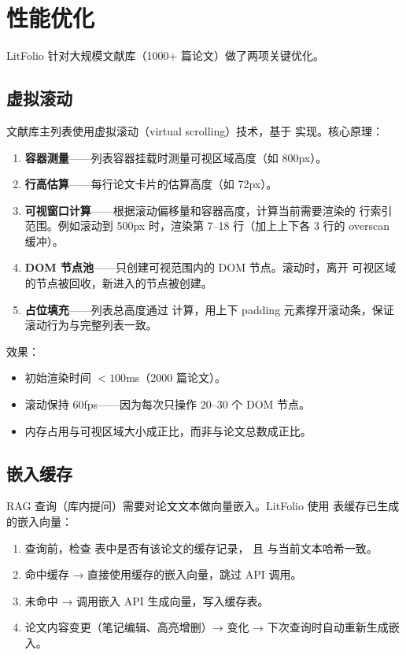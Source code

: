 \section{性能优化}

LitFolio 针对大规模文献库（1000+ 篇论文）做了两项关键优化。

\subsection{虚拟滚动}

文献库主列表使用虚拟滚动（virtual scrolling）技术，基于
 实现。核心原理：

\begin{enumerate}
  \item \textbf{容器测量}——列表容器挂载时测量可视区域高度（如 800px）。
  \item \textbf{行高估算}——每行论文卡片的估算高度（如 72px）。
  \item \textbf{可视窗口计算}——根据滚动偏移量和容器高度，计算当前需要渲染的
    行索引范围。例如滚动到 500px 时，渲染第 7--18 行（加上上下各 3 行的
    overscan 缓冲）。
  \item \textbf{DOM 节点池}——只创建可视范围内的 DOM 节点。滚动时，离开
    可视区域的节点被回收，新进入的节点被创建。
  \item \textbf{占位填充}——列表总高度通过 
    计算，用上下 padding 元素撑开滚动条，保证滚动行为与完整列表一致。
\end{enumerate}

效果：

\begin{itemize}
  \item 初始渲染时间 $< 100$ms（2000 篇论文）。
  \item 滚动保持 60fps——因为每次只操作 20--30 个 DOM 节点。
  \item 内存占用与可视区域大小成正比，而非与论文总数成正比。
\end{itemize}

\subsection{嵌入缓存}

RAG 查询（库内提问）需要对论文文本做向量嵌入。LitFolio 使用
 表缓存已生成的嵌入向量：

\begin{enumerate}
  \item 查询前，检查  表中是否有该论文的缓存记录，
    且  与当前文本哈希一致。
  \item 命中缓存 → 直接使用缓存的嵌入向量，跳过 API 调用。
  \item 未命中 → 调用嵌入 API 生成向量，写入缓存表。
  \item 论文内容变更（笔记编辑、高亮增删）→  变化 →
    下次查询时自动重新生成嵌入。
\end{enumerate}

